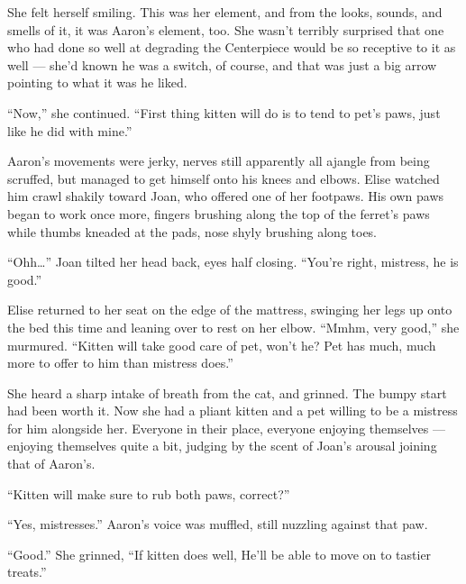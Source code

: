 \documentclass[12pt,letterpaper,oneside]{memoir}
\begin{document}
  She felt herself smiling. This was her element, and from the looks, sounds, and smells of it, it was Aaron's element, too. She wasn't terribly surprised that one who had done so well at degrading the Centerpiece would be so receptive to it as well --- she'd known he was a switch, of course, and that was just a big arrow pointing to what it was he liked.

  ``Now,'' she continued. ``First thing kitten will do is to tend to pet's paws, just like he did with mine.''

  Aaron's movements were jerky, nerves still apparently all ajangle from being scruffed, but managed to get himself onto his knees and elbows. Elise watched him crawl shakily toward Joan, who offered one of her footpaws. His own paws began to work once more, fingers brushing along the top of the ferret's paws while thumbs kneaded at the pads, nose shyly brushing along toes.

  ``Ohh\ldots{}'' Joan tilted her head back, eyes half closing. ``You're right, mistress, he is good.''

  Elise returned to her seat on the edge of the mattress, swinging her legs up onto the bed this time and leaning over to rest on her elbow. ``Mmhm, very good,'' she murmured. ``Kitten will take good care of pet, won't he? Pet has much, much more to offer to him than mistress does.''

  She heard a sharp intake of breath from the cat, and grinned. The bumpy start had been worth it. Now she had a pliant kitten and a pet willing to be a mistress for him alongside her. Everyone in their place, everyone enjoying themselves --- enjoying themselves quite a bit, judging by the scent of Joan's arousal joining that of Aaron's.

  ``Kitten will make sure to rub both paws, correct?''

  ``Yes, mistresses.'' Aaron's voice was muffled, still nuzzling against that paw.

  ``Good.'' She grinned, ``If kitten does well, He'll be able to move on to tastier treats.''
\end{document}
